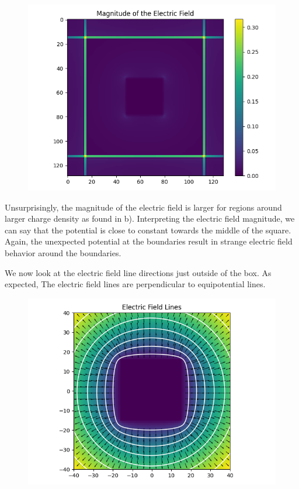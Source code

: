 \documentclass[]{article}
\begin{document}
\begin{figure}[h!]
	\centering
	\includegraphics[width=0.45\linewidth]{../Results/2c2.png}
\end{figure}
Unsurprisingly, the magnitude of the electric field is larger for regions around larger charge density as found in b). Interpreting the electric field magnitude, we can say that the potential is close to constant towards the middle of the square. Again, the unexpected potential at the boundaries result in strange electric field behavior around the boundaries. 

We now look at the electric field line directions just outside of the box. As expected, The electric field lines are perpendicular to equipotential lines.

\begin{figure}[h!]
	\centering
	\includegraphics[width=0.45\linewidth]{../Results/2c3.png}
\end{figure}
\end{document}
